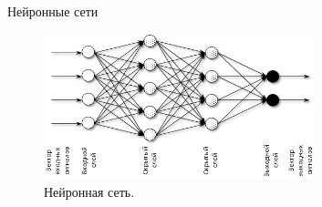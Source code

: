 \documentclass{beamer}
\begin{document}
\begin{frame}{Нейронные сети}
\begin{figure}[h]
    \centering
  \includegraphics[width=0.7\textwidth]{nn_vizualisation.png}
  \caption{Нейронная сеть.}
  \label{fig:neuron}
\end{figure}
\end{frame}
\end{document}

